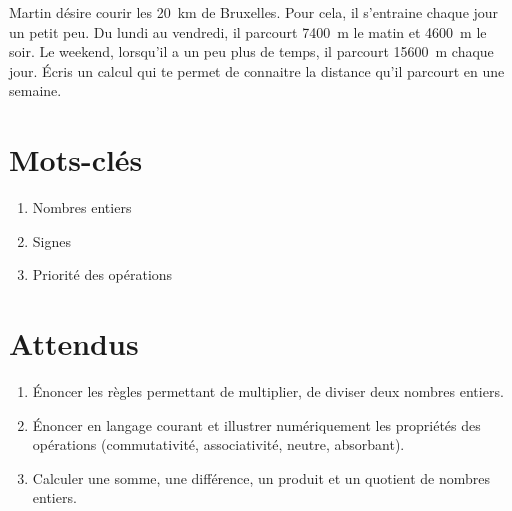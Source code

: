 \documentclass[../../syllabus_1.tex]{subfiles}
\begin{document}
\begin{exercise}
    Martin désire courir les \SI{20}{km} de Bruxelles. Pour cela, il s'entraine chaque jour un petit peu. Du lundi au vendredi, il parcourt \SI{7400}{m} le matin et \SI{4600}{m} le soir. Le weekend,
    lorsqu'il a un peu plus de temps, il parcourt \SI{15600}{m} chaque jour. Écris un calcul qui te permet de connaitre la distance qu'il parcourt en une semaine.
\end{exercise}

\newpage
\section*{Mots-clés}
\begin{enumerate}[cols=2, label=\textbf{\arabic*.}]
    \item Nombres entiers
    \item Signes
    \item Priorité des opérations
\end{enumerate}

\section*{Attendus}
\begin{enumerate}[label=\textbf{\arabic*.}]
    \item Énoncer les règles permettant de multiplier, de diviser deux nombres entiers.
    \item Énoncer en langage courant et illustrer numériquement les propriétés des opérations (commutativité, associativité, neutre, absorbant).
    \item Calculer une somme, une différence, un produit et un quotient de nombres entiers.
\end{enumerate}
\end{document}
